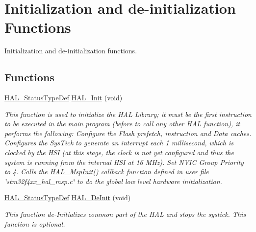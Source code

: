 \hypertarget{group___h_a_l___exported___functions___group1}{}\section{Initialization and de-\/initialization Functions}
\label{group___h_a_l___exported___functions___group1}


Initialization and de-\/initialization functions.  


\subsection*{Functions}
\begin{DoxyCompactItemize}
\item 
\hyperlink{stm32f4xx__hal__def_8h_a63c0679d1cb8b8c684fbb0632743478f}{H\+A\+L\+\_\+\+Status\+Type\+Def} \hyperlink{group___h_a_l___exported___functions___group1_gaecac54d350c3730e6831eb404e557dc4}{H\+A\+L\+\_\+\+Init} (void)
\begin{DoxyCompactList}\small\item\em This function is used to initialize the H\+AL Library; it must be the first instruction to be executed in the main program (before to call any other H\+AL function), it performs the following\+: Configure the Flash prefetch, instruction and Data caches. Configures the Sys\+Tick to generate an interrupt each 1 millisecond, which is clocked by the H\+SI (at this stage, the clock is not yet configured and thus the system is running from the internal H\+SI at 16 M\+Hz). Set N\+V\+IC Group Priority to 4. Calls the \hyperlink{group___h_a_l___exported___functions___group1_ga07e099a69ab23e79be8b7a80505de519}{H\+A\+L\+\_\+\+Msp\+Init()} callback function defined in user file \char`\"{}stm32f4xx\+\_\+hal\+\_\+msp.\+c\char`\"{} to do the global low level hardware initialization. \end{DoxyCompactList}\item 
\hyperlink{stm32f4xx__hal__def_8h_a63c0679d1cb8b8c684fbb0632743478f}{H\+A\+L\+\_\+\+Status\+Type\+Def} \hyperlink{group___h_a_l___exported___functions___group1_ga95911129a26afb05232caaaefa31956f}{H\+A\+L\+\_\+\+De\+Init} (void)
\begin{DoxyCompactList}\small\item\em This function de-\/\+Initializes common part of the H\+AL and stops the systick. This function is optional. \end{DoxyCompactList}\item 

\end{DoxyCompactItemize}
